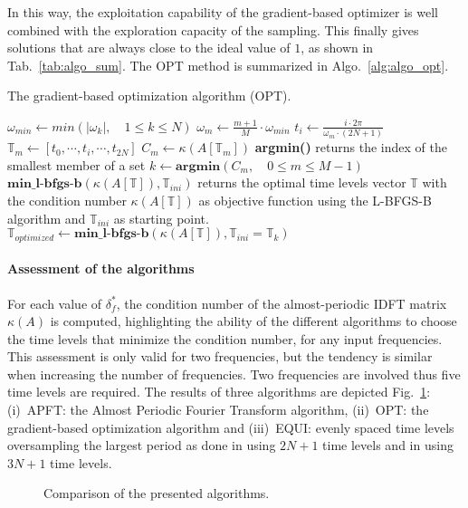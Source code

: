 In this way, the exploitation capability of the gradient-based
optimizer is well combined with the exploration capacity of the
sampling.  This finally gives solutions that are always close to the
ideal value of $1$, as shown in Tab.~\ref{tab:algo_sum}.  The OPT
method is summarized in Algo.~\ref{alg:algo_opt}.
\begin{algorithm}
\caption{The gradient-based optimization algorithm (OPT).}
\label{alg:algo_opt}
\begin{algorithmic}
\STATE $\omega_{min} \leftarrow min \left( |\omega_k |,\quad 1 \leqslant k \leqslant N \right)$
    \STATE $\omega_m \leftarrow \frac{m + 1}{M} \cdot \omega_{min}$
        \STATE $t_i \leftarrow \displaystyle\frac{i \cdot 2 \pi}{\omega_m \cdot (2N + 1)}$
    \ENDFOR
    \STATE $\mathbb{T}_m \leftarrow [t_0, \cdots, t_i, \cdots, t_{2N}]$
    \STATE $C_m \leftarrow \kappa \left(A \left[\mathbb{T}_m \right] \right)$
\ENDFOR
\STATE \textbf{argmin()} returns the index of the smallest member of a set
\STATE $k \leftarrow \textbf{argmin}\left(C_m,\quad 0\leqslant m \leqslant M-1\right)$
\STATE $\textbf{min\_l-bfgs-b}\left(\kappa \left(A\left[\mathbb{T}\right]\right), \mathbb{T}_{ini}\right)$ returns the optimal 
time levels vector $\mathbb{T}$ with the condition number $\kappa\left(A\left[\mathbb{T}\right]\right)$ as objective function 
using the L-BFGS-B algorithm and  $\mathbb{T}_{ini}$ as starting point.
\STATE $\mathbb{T}_{optimized} \leftarrow 
  \textbf{min\_l-bfgs-b}\left(\kappa\left(A\left[\mathbb{T}\right]\right), \mathbb{T}_{ini}=\mathbb{T}_k\right)$
\end{algorithmic}
\end{algorithm}

\paragraph{Assessment of the algorithms}

For each value of $\delta_f^*$, the condition number of the
almost-periodic IDFT matrix $\kappa ( A )$ is computed, highlighting
the ability of the different algorithms to choose the time levels that
minimize the condition number, for any input frequencies. This
assessment is only valid for two frequencies, but the tendency is similar
when increasing the number of frequencies. Two frequencies are
involved thus five time levels are required. The results of three
algorithms are depicted Fig.~\ref{fig:bench_algo}: (i)~APFT: the
Almost Periodic Fourier Transform algorithm, (ii)~OPT: the
gradient-based optimization algorithm and (iii)~EQUI: evenly spaced
time levels oversampling the largest period as done in
\citet{Gopinath2007} using $2N+1$ time
levels and in \citet{Ekici2007, Ekici2008} using $3N+1$
time levels.
\begin{figure}[htb]
  \centering 
    \quad{}
  \caption{Comparison of the presented algorithms.}
  \label{fig:bench_algo}
\end{figure}

